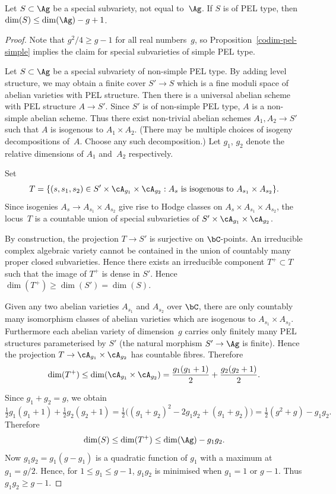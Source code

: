 \begin{proposition}\label{codim-pel}
Let $S \subset \Ag$ be a special subvariety, not equal to~$\Ag$.
If $S$ is of PEL type, then $\dim(S) \leq \dim(\Ag) - g + 1$.
\end{proposition}

\begin{proof}
Note that $g^2/4 \geq g-1$ for all real numbers~$g$, so Proposition~\ref{codim-pel-simple} implies the claim for special subvarieties of simple PEL type.

Let $S \subset \Ag$ be a special subvariety of non-simple PEL type.
By adding level structure, we may obtain a finite cover $S' \to S$ which is a fine moduli space of abelian varieties with PEL structure.
Then there is a universal abelian scheme with PEL structure $A \to S'$.
Since $S'$ is of non-simple PEL type, $A$ is a non-simple abelian scheme.
Thus there exist non-trivial abelian schemes $A_1, A_2 \to S'$ such that $A$ is isogenous to $A_1 \times A_2$. (There may be multiple choices of isogeny decompositions of~$A$. Choose any such decomposition.)
Let $g_1$, $g_2$ denote the relative dimensions of $A_1$ and~$A_2$ respectively.

Set
\[
T = \{ (s, s_1, s_2) \in S' \times \cA_{g_1} \times \cA_{g_2} : A_s \text{ is isogenous to } A_{s_1} \times A_{s_2} \}.
\]
Since isogenies $A_s \to A_{s_1} \times A_{s_2}$ give rise to Hodge classes on $A_s \times A_{s_1} \times A_{s_2}$, the locus~$T$ is a countable union of special subvarieties of $S' \times \cA_{g_1} \times \cA_{g_2}$.

By construction, the projection $T \to S'$ is surjective on $\bC$-points.
An irreducible complex algebraic variety cannot be contained in the union of countably many proper closed subvarieties.
Hence there exists an irreducible component $T^+ \subset T$ such that the image of $T^+$ is dense in $S'$.
Hence $\dim(T^+) \geq \dim(S') = \dim(S)$.

Given any two abelian varieties $A_{s_1}$ and $A_{s_2}$ over $\bC$, there are only countably many isomorphism classes of abelian varieties which are isogenous to $A_{s_1} \times A_{s_2}$.
Furthermore each abelian variety of dimension~$g$ carries only finitely many PEL structures parameterised by $S'$ (the natural morphism $S' \to \Ag$ is finite).
Hence the projection $T \to \cA_{g_1} \times \cA_{g_2}$ has countable fibres.
Therefore
\[
\dim(T^+) \leq \dim(\cA_{g_1} \times \cA_{g_2}) = \frac{g_1(g_1+1)}{2} + \frac{g_2(g_2+1)}{2}.
\]

Since $g_1+g_2=g$, we obtain
\[
\tfrac{1}{2}g_1(g_1+1) + \tfrac{1}{2}g_2(g_2+1)
= \tfrac{1}{2}\bigl( (g_1+g_2)^2 - 2g_1g_2 + (g_1+g_2) \bigr)
= \tfrac{1}{2}(g^2+g) - g_1g_2.
\]
Therefore
\[
\dim(S) \leq \dim(T^+) \leq \dim(\Ag) - g_1g_2.
\]
Now $g_1g_2 = g_1(g-g_1)$ is a quadratic function of $g_1$ with a maximum at $g_1=g/2$.
Hence, for $1 \leq g_1 \leq g-1$, $g_1g_2$ is minimised when $g_1 = 1$ or $g-1$.
Thus $g_1g_2 \geq g-1$.
\end{proof}

